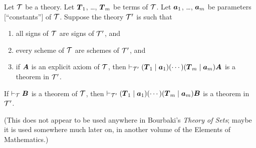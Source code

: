 \begin{dc}\label{c5}%
Let $\mathcal{T}$ be a theory. Let $\boldsymbol{T}_{1}$, \dots,
$\boldsymbol{T}_{m}$ be terms of $\mathcal{T}$. Let
$\boldsymbol{a}_{1}$, \dots, $\boldsymbol{a}_{m}$ be parameters
[``constants''] of $\mathcal{T}$. Suppose the theory $\mathcal{T}'$ is
such that
\begin{enumerate}
\item all signs of $\mathcal{T}$ are signs of $\mathcal{T}'$, and
\item every scheme of $\mathcal{T}$ are schemes of $\mathcal{T}'$, and
\item if $\boldsymbol{A}$ is an explicit axiom of $\mathcal{T}$, then $\vdash_{\mathcal{T}'}(\boldsymbol{T}_{1}\mid\boldsymbol{a}_{1})(\cdots)(\boldsymbol{T}_{m}\mid\boldsymbol{a}_{m})\boldsymbol{A}$
is a theorem in $\mathcal{T}'$.
\end{enumerate}
If $\vdash_{\mathcal{T}}\boldsymbol{B}$ is a theorem of $\mathcal{T}$,
then 
$\vdash_{\mathcal{T}'}(\boldsymbol{T}_{1}\mid\boldsymbol{a}_{1})(\cdots)(\boldsymbol{T}_{m}\mid\boldsymbol{a}_{m})\boldsymbol{B}$
is a theorem in $\mathcal{T}'$.
\end{dc}
(This does not appear to be used anywhere in Bourbaki's \textit{Theory of Sets};
maybe it is used somewhere much later on, in another volume of the
Elements of Mathematics.)
